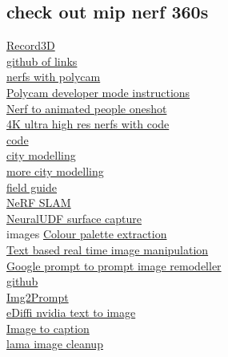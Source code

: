 \subsection{check out mip nerf 360s}
\href{https://github.com/marek-simonik/record3d_unity_streaming}{Record3D}\\
\href{https://github.com/yenchenlin/awesome-NeRF}{github of links}\\
\href{https://www.linkedin.com/posts/robcsloan_nerfstudio-nerfstudio-polycam-activity-6999169160379297792-SN4F?utm_source=share&utm_medium=member_deskto>}{nerfs with polycam}\\
\href{https://docs.nerf.studio/en/latest/quickstart/custom_dataset.html#polycam-capture}{Polycam developer mode instructions}\\
\href{https://elicit3d.github.io/}{Nerf to animated people oneshot}\\
\href{https://paperswithcode.com/paper/4k-nerf-high-fidelity-neural-radiance-fields}{4K ultra high res nerfs with code}\\
\href{https://github.com/frozoul/4K-NeRF}{code}\\
\href{https://www.reddit.com/r/deeplearning/comments/zowgqn/neural_rendering_reconstruct_your_city_in_3d/}{city modelling}\\
\href{https://waymo.com/research/block-nerf/}{more city modelling}\\
\href{https://github.com/3a1b2c3/seeingSpace/wiki/Hands-on:-Getting-started-and-Nerf-frameworks}{field guide}\\
\href{https://github.com/ToniRV/NeRF-SLAM}{NeRF SLAM}\\
\href{https://www.xxlong.site/NeuralUDF/}{NeuralUDF surface capture}\\
images
\href{https://github.com/mattdesl/gifenc}{Colour palette extraction}\\
\href{https://arxiv.org/abs/2210.09276}{Text based real time image manipulation}\\
\href{https://www.youtube.com/watch?v=lHcPtbZ0Mnc}{Google prompt to prompt image remodeller}\\
\href{https://github.com/google/prompt-to-prompt}{github}\\
\href{https://replicate.com/methexis-inc#}{Img2Prompt}\\
\href{https://deepimagination.cc/eDiffi/}{eDiffi nvidia text to image}\\
\href{https://laion.ai/blog/laion-coco/}{Image to caption}\\
\href{https://github.com/Sanster/lama-cleaner}{lama image cleanup}\\
